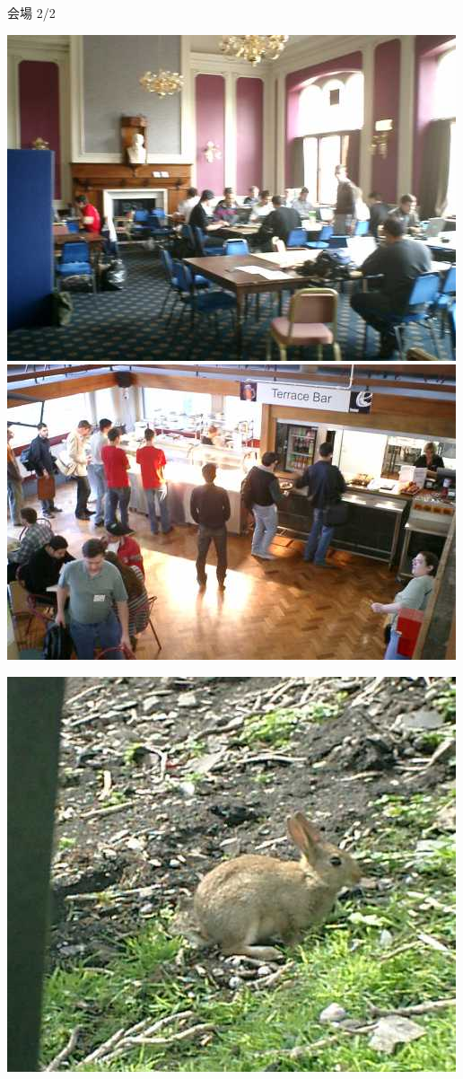 \documentclass[cjk,dvipdfmx,12pt]{beamer}
\begin{document}
\begin{frame}{会場 2/2}
\begin{minipage}{0.49\hsize}
  \includegraphics[width=1\hsize]{image200707/hacklab.jpg}\\
  \includegraphics[width=1\hsize]{image200707/lunchplace.jpg}
\end{minipage}
\begin{minipage}{0.49\hsize}
  \includegraphics[width=1\hsize]{image200707/rabbit.jpg}\\

\end{minipage}
\end{frame}
\end{document}
